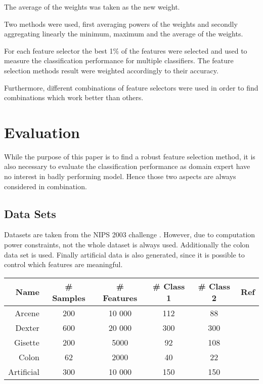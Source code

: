 \documentclass[twoside,11pt]{article}
\begin{document}
{\begin{description}[align=left]
\item [Linear aggregation :] The average of the weights was taken as the new weight.
\item [Non-linear aggregation :] Two methods were used, first averaging powers of the weights and secondly aggregating linearly the minimum, maximum and the average of the weights.
\item [Performance related aggregation :] For each feature selector the best 1\% of the features were selected and used to measure the classification performance for multiple classifiers. The feature selection methods result were weighted accordingly to their accuracy.
\end{description}

Furthermore, different combinations of feature selectors were used in order to find combinations which work better than others.

\section{Evaluation}

While the purpose of this paper is to find a robust feature selection method, it is also necessary to evaluate the classification performance as domain expert have no interest in badly performing model. Hence those two aspects are always considered in combination.

\subsection{Data Sets}
Datasets are taken from the NIPS 2003 challenge \cite{NIPS}. However, due to computation power constraints, not the whole dataset is always used. Additionally the colon data set \cite{alon1999broad} is used. Finally artificial data is also generated, since it is possible to control which features are meaningful. 

\begin{center}
    \begin{tabular}{| r | c | c | c | c | c |}
    \hline
    Name & \# Samples & \# Features & \# Class 1 & \# Class 2 & Ref\\ \hline
    Arcene & 200 & 10 000 & 112 & 88 & \cite{NIPS} \\
    Dexter & 600 & 20 000 & 300 & 300 & \cite{NIPS} \\
    Gisette & 200 & 5000 & 92 & 108 & \cite{NIPS} \\
    Colon & 62 & 2000 & 40 & 22 &  \cite{alon1999broad} \\
    Artificial & 300 & 10 000 & 150 & 150 & \\
    \hline
    \end{tabular}
\end{center}

}
\end{document}

